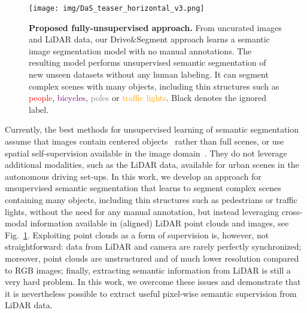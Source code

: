\documentclass[runningheads]{llncs}
\newcommand{\ours}{Drive$\&$Segment\xspace}
\begin{document}
\begin{figure}[t]
    \centering
    \texttt{[image: img/DaS\_teaser\_horizontal\_v3.png]}
    \vspace{-20pt}
    \caption{
    {\bf Proposed fully-unsupervised approach.} From uncurated images and LiDAR data, our \ours approach learns a semantic image segmentation model with no manual annotations. The resulting model performs unsupervised semantic segmentation of new unseen datasets 
    without any human labeling. It can segment complex scenes with many objects, including thin structures such as \textcolor{red}{people}, \textcolor{purple}{bicycles}, \textcolor{gray}{poles} or \textcolor{orange}{traffic lights}. Black denotes the ignored label.
    }
    \label{fig:teaser}
    \vspace{-15pt}
\end{figure}

Currently, the best methods for unsupervised learning of semantic segmentation assume that images contain centered objects~\cite{van2021unsupervised} rather than full scenes, or use spatial self-supervision available in the image domain~\cite{cho2021picie}. They do not leverage additional modalities, such as the LiDAR data, available for urban scenes in the autonomous driving set-ups. In this work, we develop an approach for unsupervised semantic segmentation that learns to segment complex scenes containing many objects, including thin structures such as pedestrians or traffic lights, without the need for any manual annotation, but instead leveraging cross-modal information available in (aligned) LiDAR point clouds and images, see Fig.~\ref{fig:teaser}. 
Exploiting point clouds as a form of supervision is, however, not straightforward: data from LiDAR and camera are rarely perfectly synchronized; moreover, point clouds are unstructured and of much lower resolution compared to RGB images; finally, extracting semantic information from LiDAR is still a very hard problem. In this work, we overcome these issues and demonstrate that it is nevertheless possible to extract useful pixel-wise semantic supervision from LiDAR data.
\end{document}
